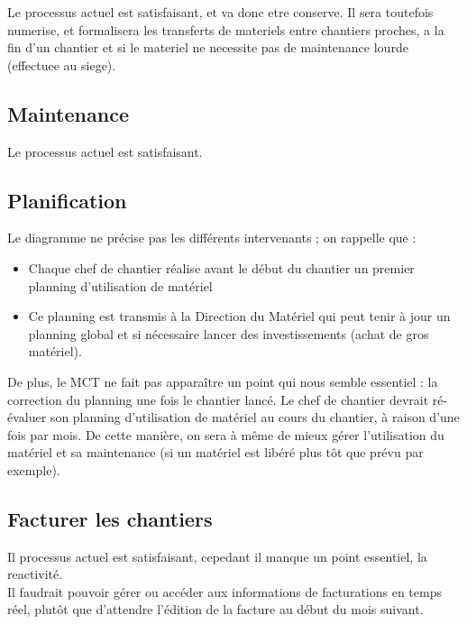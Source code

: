 \documentclass[a4paper]{article}
\begin{document}

Le processus actuel est satisfaisant, et va donc etre conserve. Il sera
toutefois numerise, et formalisera les transferts de materiels entre
chantiers proches, a la fin d'un chantier et si le materiel ne necessite
pas de maintenance lourde (effectuee au siege).


\subsection{Maintenance}

Le processus actuel est satisfaisant.

\subsection{Planification}

Le diagramme ne précise pas les différents intervenants ; on rappelle que :
\begin{itemize}
\item Chaque chef de chantier réalise avant le début du chantier un premier
planning d'utilisation de matériel
\item Ce planning est transmis à la Direction du Matériel qui peut tenir à
jour un planning global et si nécessaire lancer des investissements (achat
de gros matériel).
\end{itemize}

\vskip 6pt

De plus, le MCT ne fait pas apparaître un point qui nous semble essentiel :
la correction du planning une fois le chantier lancé. Le chef de chantier
devrait ré-évaluer son planning d'utilisation de matériel au cours du
chantier, à raison d'une fois par mois. De cette manière, on sera à même de
mieux gérer l'utilisation du matériel et sa maintenance (si un matériel est
libéré plus tôt que prévu par exemple).


\subsection{Facturer les chantiers}

Il processus actuel est satisfaisant, cepedant il manque un point essentiel,
la reactivité. \\
Il faudrait pouvoir gérer ou accéder aux informations de facturations en 
temps réel, plutôt que d’attendre l’édition de la facture au début du 
mois suivant.
\end{document}
